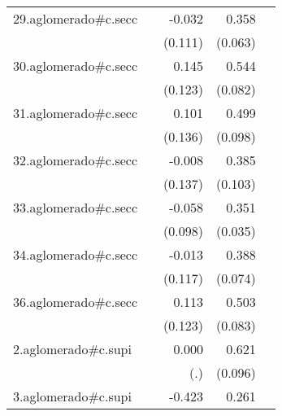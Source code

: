 {\begin{longtable}{l*{4}{D{.}{.}{-1}}}
\addlinespace
29.aglomerado#c.secc&                     &      -0.032         &       0.358\sym{***}&                     \\
            &                     &     (0.111)         &     (0.063)         &                     \\
\addlinespace
30.aglomerado#c.secc&                     &       0.145         &       0.544\sym{***}&                     \\
            &                     &     (0.123)         &     (0.082)         &                     \\
\addlinespace
31.aglomerado#c.secc&                     &       0.101         &       0.499\sym{***}&                     \\
            &                     &     (0.136)         &     (0.098)         &                     \\
\addlinespace
32.aglomerado#c.secc&                     &      -0.008         &       0.385\sym{***}&                     \\
            &                     &     (0.137)         &     (0.103)         &                     \\
\addlinespace
33.aglomerado#c.secc&                     &      -0.058         &       0.351\sym{***}&                     \\
            &                     &     (0.098)         &     (0.035)         &                     \\
\addlinespace
34.aglomerado#c.secc&                     &      -0.013         &       0.388\sym{***}&                     \\
            &                     &     (0.117)         &     (0.074)         &                     \\
\addlinespace
36.aglomerado#c.secc&                     &       0.113         &       0.503\sym{***}&                     \\
            &                     &     (0.123)         &     (0.083)         &                     \\
\addlinespace
2.aglomerado#c.supi&                     &       0.000         &       0.621\sym{***}&                     \\
            &                     &         (.)         &     (0.096)         &                     \\
\addlinespace
3.aglomerado#c.supi&                     &      -0.423\sym{**} &       0.261\sym{**} &                     \\

\end{longtable}}
